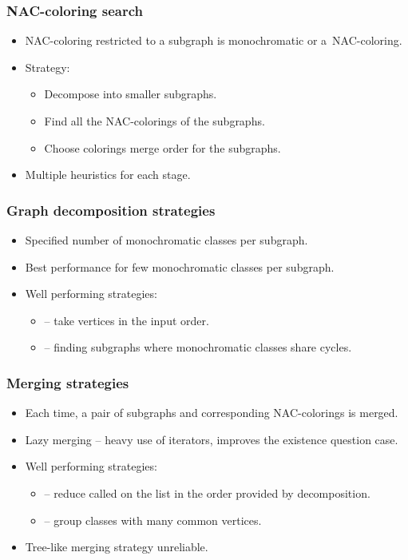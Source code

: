 \documentclass[aspectratio=\myaspectratio]{beamer}
\begin{document}
\begin{frame}
	\frametitle{NAC-coloring search}
	\begin{itemize}
		\item
		      NAC-coloring restricted to a subgraph
		      is monochromatic or a~NAC-coloring.
		\item
		      Strategy:
		      \begin{itemize}
			      \item
			            Decompose into smaller subgraphs.
			      \item
			            Find all the NAC-colorings of the subgraphs.
			      \item
			            Choose colorings merge order for the subgraphs.
		      \end{itemize}
		\item
		      Multiple heuristics for each stage.
	\end{itemize}
\end{frame}

\begin{frame}
	\frametitle{Graph decomposition strategies}

	\begin{itemize}
		\item
		      Specified number of monochromatic classes per subgraph.
		\item
		      Best performance for few monochromatic classes per subgraph.
		\item
		      Well performing strategies:
		      \begin{itemize}
			      \item
			            \None{} -- take vertices in the input order.
			      \item
			            \Neighbors{} -- finding subgraphs where monochromatic classes share cycles.
		      \end{itemize}
	\end{itemize}
\end{frame}

\begin{frame}
	\frametitle{Merging strategies}

	\begin{itemize}
		\item
		      Each time, a pair of subgraphs and corresponding NAC-colorings is merged.
		\item
		      Lazy merging -- heavy use of iterators, improves the existence question case.
		\item
		      Well performing strategies:
		      \begin{itemize}
			      \item
			            \MergeLinear{} -- reduce called on the list in the order provided by decomposition.
			      \item
			            \SharedVertices{} -- group classes with many common vertices.
		      \end{itemize}
		\item
		      Tree-like merging strategy unreliable.
	\end{itemize}
\end{frame}
\end{document}
